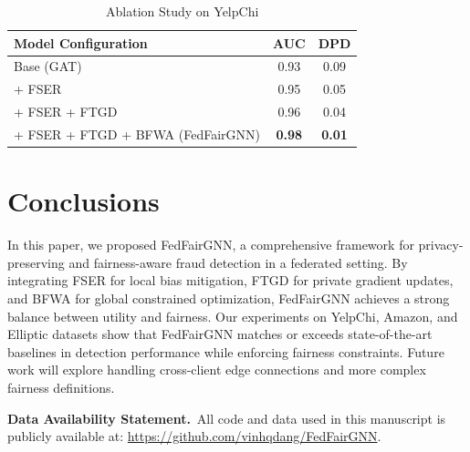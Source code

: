 \documentclass[pmlr]{jmlr}%
\begin{document}
\begin{table}[t]
\centering
\caption{Ablation Study on YelpChi}
\label{tab:ablation}
\begin{tabular}{lcc}
\toprule
Model Configuration & AUC & DPD \\
\midrule
Base (GAT) & 0.93 & 0.09 \\
+ FSER & 0.95 & 0.05 \\
+ FSER + FTGD & 0.96 & 0.04 \\
+ FSER + FTGD + BFWA (FedFairGNN) & \textbf{0.98} & \textbf{0.01} \\
\bottomrule
\end{tabular}
\end{table}

\section{Conclusions}
\label{sec:conclusion}
In this paper, we proposed FedFairGNN, a comprehensive framework for privacy-preserving and fairness-aware fraud detection in a federated setting. By integrating FSER for local bias mitigation, FTGD for private gradient updates, and BFWA for global constrained optimization, FedFairGNN achieves a strong balance between utility and fairness. Our experiments on YelpChi, Amazon, and Elliptic datasets show that FedFairGNN matches or exceeds state-of-the-art baselines in detection performance while enforcing fairness constraints. Future work will explore handling cross-client edge connections and more complex fairness definitions.

\vskip 0.2in
\noindent\textbf{Data Availability Statement.}\ All code and data used in this manuscript is publicly available at: \url{https://github.com/vinhqdang/FedFairGNN}.


\end{document}
